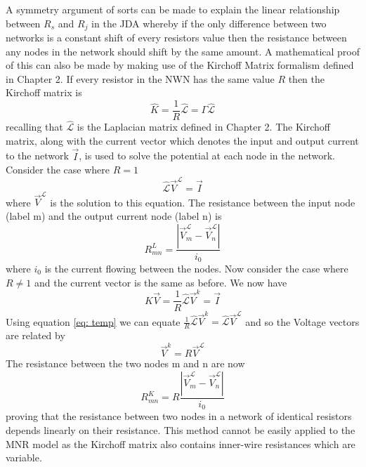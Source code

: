 A symmetry argument of sorts can be made to explain the linear relationship between $R_s$ and $R_j$ in the JDA whereby if the only difference between two networks is a constant shift of every resistors value then the resistance between any nodes in the network should shift by the same amount. A mathematical proof of this can also be made by making use of the Kirchoff Matrix formalism defined in Chapter 2. If every resistor in the NWN has the same value $R$ then the Kirchoff matrix is 
\begin{equation}
\hat{K} = \frac{1}{R} \hat{\mathcal{L}} = \Gamma \hat{\mathcal{L}}
\end{equation}
recalling that $\hat{\mathcal{L}}$ is the Laplacian matrix defined in Chapter 2. The Kirchoff matrix, along with the current vector which denotes the input and output current to the network $\vec{I}$, is used to solve the potential at each node in the network. Consider the case where $R = 1$
\begin{equation}
\hat{\mathcal{L}} \vec{V}^\mathcal{L} = \vec{I} 
\label{eq: temp}
\end{equation}
where $\vec{V}^\mathcal{L}$ is the solution to this equation. The resistance between the input node (label m) and the output current node (label n) is
\begin{equation}
R^L_{mn} = \frac{| \vec{V}^\mathcal{L}_m - \vec{V}^\mathcal{L}_n|}{i_0}
\end{equation}
where $i_0$ is the current flowing between the nodes. Now consider the case where $R \neq 1$ and the current vector is the same as before. We now have
\begin{equation}
\hat{K}\vec{V} = \frac{1}{R}\hat{\mathcal{L}}\vec{V}^k = \vec{I}
\end{equation}
Using equation \ref{eq: temp} we can equate $ \frac{1}{R}\hat{\mathcal{L}}\vec{V}^k = \hat{\mathcal{L}}\vec{V}^\mathcal{L}$ and so the Voltage vectors are related by
\begin{equation}
\vec{V}^k = R \vec{V}^\mathcal{L}
\end{equation}
The resistance between the two nodes m and n are now
\begin{equation}
R^K_{mn} = R \frac{| \vec{V}^\mathcal{L}_m - \vec{V}^\mathcal{L}_n|}{i_0}
\end{equation}
proving that the resistance between two nodes in a network of identical resistors depends linearly on their resistance. This method cannot be easily applied to the MNR model as the Kirchoff matrix also contains inner-wire resistances which are variable.

